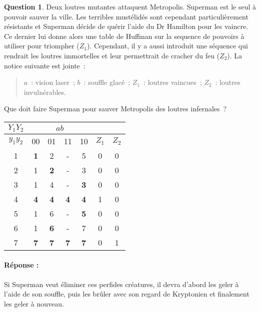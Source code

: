 \documentclass[11pt,a4paper]{article}
\theoremstyle{definition}%
\newtheorem{Q}{Question}[] %
\newcommand{\reponse}[1]{%
	\ifthenelse {\boolean{corrige}} {\paragraph{Réponse :} \color{darkblue}   #1\color{black}} {}
 }
\begin{document}
\begin{Q}
	Deux loutres mutantes attaquent Metropolis.
	Superman est le seul à pouvoir sauver la ville.
	Les terribles mustélidés sont cependant particulièrement résistants et Superman décide de quérir l'aide du Dr Hamilton pour les vaincre.
	Ce dernier lui donne alors une table de Huffman sur la sequence de pouvoirs à utiliser pour triompher ($Z_1$).
	Cependant, il y a aussi introduit une séquence qui rendrait les loutres immortelles et leur permettrait de cracher du feu ($Z_2$).
	La notice suivante est jointe~:
	\begin{verse}
		$a$~: vision laser~; $b$~: souffle glacé~; $Z_1$~: loutres vaincues~; $Z_2$~: loutres invulnérables.
	\end{verse}

	Que doit faire Superman pour sauver Metropolis des loutres infernales~?

	\begin{center}
		\begin{tabular}{|c|c|c|c|c|c|c|} \hline
			$Y_1Y_2$& \multicolumn{4}{c|}{$ab$} & & \\ \hline
			$y_1y_2$& 00 & 01 & 11 & 10 & $Z_1$ & $Z_2$\\ \hline
			1 & \textbf{1} & 2 & - & 5 & 0 & 0 \\ \hline
			2 & 1 & \textbf{2} & - & 3 & 0 & 0 \\ \hline
			3 & 1 & 4 & - & \textbf{3} & 0 & 0 \\ \hline
			4 & \textbf{4} & \textbf{4} & \textbf{4} & \textbf{4} & 1 & 0 \\ \hline
			5 & 1 & 6 & - & \textbf{5} & 0 & 0\\ \hline
			6 & 1 & \textbf{6} & - & 7 & 0 & 0 \\ \hline
			7 & \textbf{7} & \textbf{7} & \textbf{7} & \textbf{7} & 0 & 1 \\ \hline
		\end{tabular}
	\end{center}

	\reponse{
		Si Superman veut éliminer ces perfides créatures, il devra d'abord les geler à l'aide de son souffle, puis les brûler avec son regard de Kryptonien et finalement les geler à nouveau.
	}
\end{Q}
\end{document}
